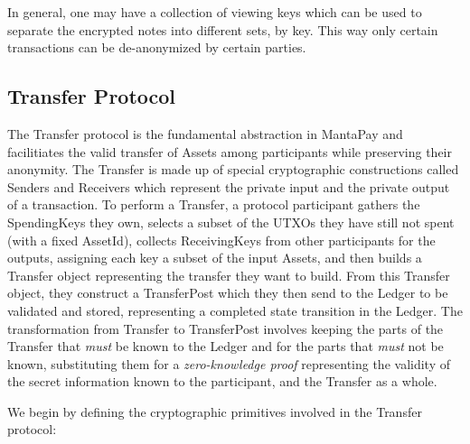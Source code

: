 \documentclass[a4paper]{article}
\newcommand{\lsubsection}[2]{\def\sectionlabel{#2} \subsection{#1}\label{sec:#2}}
\theoremstyle{definition}
\newcommand{\AssetId}{{\textsf{AssetId}}}
\newcommand{\Asset}{{\textsf{Asset}}}
\newcommand{\Ledger}{{\textsf{Ledger}}}
\newcommand{\MantaPay}{{\textsf{MantaPay}}}
\newcommand{\Receiver}{{\textsf{Receiver}}}
\newcommand{\ReceivingKey}{{\textsf{ReceivingKey}}}
\newcommand{\Sender}{{\textsf{Sender}}}
\newcommand{\SpendingKey}{{\textsf{SpendingKey}}}
\newcommand{\TransferPost}{{\textsf{TransferPost}}}
\newcommand{\Transfer}{{\textsf{Transfer}}}
\newcommand{\UTXO}{{\textsf{UTXO}}}
\begin{document}
In general, one may have a collection of viewing keys which can be used to separate the encrypted notes into different sets, by key. This way only certain transactions can be de-anonymized by certain parties.

\lsubsection{\Transfer{} Protocol}{transfer-protocol}

The \Transfer{} protocol is the fundamental abstraction in \MantaPay{} and facilitiates the valid transfer of \Asset{s} among participants while preserving their anonymity. The \Transfer{} is made up of special cryptographic constructions called \Sender{s} and \Receiver{s} which represent the private input and the private output of a transaction. To perform a \Transfer{}, a protocol participant gathers the \SpendingKey{s} they own, selects a subset of the \UTXO{s} they have still not spent (with a fixed \AssetId{}), collects \ReceivingKey{s} from other participants for the outputs, assigning each key a subset of the input \Asset{s}, and then builds a \Transfer{} object representing the transfer they want to build. From this \Transfer{} object, they construct a \TransferPost{} which they then send to the \Ledger{} to be validated and stored, representing a completed state transition in the \Ledger{}. The transformation from \Transfer{} to \TransferPost{} involves keeping the parts of the \Transfer{} that \emph{must} be known to the \Ledger{} and for the parts that \emph{must} not be known, substituting them for a \emph{zero-knowledge proof} representing the validity of the secret information known to the participant, and the \Transfer{} as a whole.

We begin by defining the cryptographic primitives involved in the \Transfer{} protocol:
\end{document}
